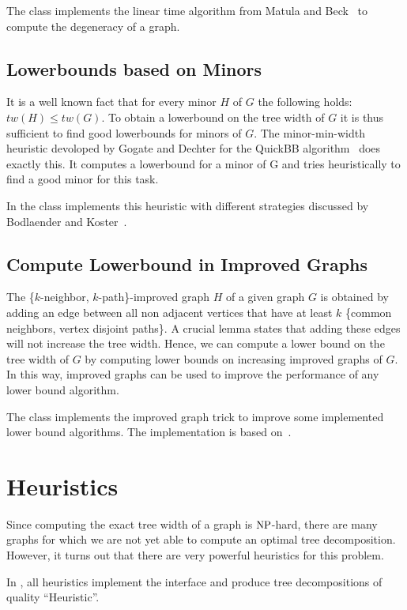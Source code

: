 \documentclass[a4paper, ukenglish, twoside, openright]{jdrasilmanual}
\begin{document}
The class  implements the linear time
algorithm from Matula and Beck~\cite{MatulaB1983} to compute the
degeneracy of a graph.

\section{Lowerbounds based on Minors}
It is a well known fact that for every minor $H$ of $G$ the following
holds: \(tw(H) \le tw(G)\). To obtain a lowerbound on the tree width
of $G$ it is thus sufficient to find good lowerbounds for minors of
$G$.  The minor-min-width heuristic devoloped by Gogate and Dechter
for the QuickBB algorithm~\cite{GogateD2004} does exactly this. It
computes a lowerbound for a minor of G and tries heuristically to find
a good minor for this task.

In \Jdrasil{} the class  implements
this heuristic with different strategies discussed by Bodlaender and Koster~\cite{bodleanderK2011}.

\section{Compute Lowerbound in Improved Graphs}
The \{$k$-neighbor, $k$-path\}-improved graph \(H\) of a given graph \(G\)
is obtained by adding an edge between all non adjacent vertices that
have at least $k$ \{common neighbors, vertex disjoint paths\}. A crucial
lemma states that adding these edges will not increase the tree
width. Hence, we can compute a lower bound on the tree width of \(G\)
by computing lower bounds on increasing improved graphs of \(G\). In
this way, improved graphs can be used to improve the performance of
any lower bound algorithm.

The class  implements the improved graph trick to improve some
implemented lower bound algorithms. The implementation is based on~\cite{bodleanderK2011}.

\chapter{Heuristics}
Since computing the exact tree width of a graph is
$\Class{NP}$-hard, there are many graphs for which we are not yet
able to compute an optimal tree decomposition. However, it turns out
that there are very powerful heuristics for this problem.

In \Jdrasil{}, all heuristics implement the interface
 and produce tree decompositions of quality ``Heuristic''.
\end{document}

